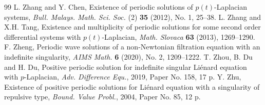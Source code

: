 \documentclass[11pt]{amsart}
\numberwithin{equation}{section} \textwidth=15.5cm
\begin{document}
\begin{thebibliography}{99}
\bibitem{[ZhC]} L. Zhang and Y. Chen, Existence of periodic solutions of $p(t)$-Laplacian systems, \textit{Bull. Malays. Math. Sci. Soc.} (2) {\bf 35}  (2012), No. 1, 25--38.
\bibitem{[ZhT]} L. Zhang and  X.H. Tang, Existence and multiplicity of periodic solutions for some second order differential systems with $p(t)$-Laplacian, \textit{Math. Slovaca} {\bf 63} (2013), 1269--1290.
\bibitem{[Zhe]} F. Zheng, Periodic wave solutions of a non-Newtonian filtration equation with an indefinite singularity, \textit{AIMS Math.} {\bf 6} (2020), No. 2, 1209--1222.
\bibitem{[ZDD]} T. Zhou, B. Du and H. Du, Positive periodic solution for indefinite singular Li\'enard equation with $p$-Laplacian, \textit{Adv. Difference Equ.}, 2019, Paper No. 158, 17 p.
\bibitem{[Zhu]} Y. Zhu, Existence of positive periodic solutions for Li\'enard equation with a singularity of repulsive type, \textit{Bound. Value Probl.}, 2004, Paper No. 85, 12 p.
\end{thebibliography}
\end{document}
